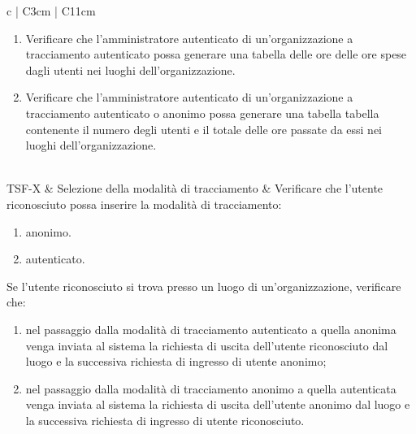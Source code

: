 {\begin{longtable}{ c | C{3cm} | C{11cm} }
\begin{enumerate}
\item Verificare che l'amministratore autenticato di un'organizzazione a tracciamento autenticato possa generare una tabella delle ore delle ore spese dagli utenti nei luoghi dell'organizzazione.
\item Verificare che l'amministratore autenticato di un'organizzazione a tracciamento autenticato o anonimo possa generare una tabella tabella contenente il numero degli utenti e il totale delle ore passate da essi nei luoghi dell’organizzazione. 
\end{enumerate} \\


TSF-X & Selezione della modalità di tracciamento & 
Verificare che l'utente riconosciuto possa inserire la modalità di tracciamento:
\begin{enumerate}
    \item anonimo.
    \item autenticato.
\end{enumerate}
Se l'utente riconosciuto si trova presso un luogo di un'organizzazione, verificare che:
\begin{enumerate}
    \item nel passaggio dalla modalità di tracciamento autenticato a quella anonima venga inviata al sistema la richiesta di uscita dell'utente riconosciuto dal luogo e la successiva richiesta di ingresso di utente anonimo;
    \item nel passaggio dalla modalità di tracciamento anonimo a quella autenticata venga inviata al sistema la richiesta di uscita dell'utente anonimo dal luogo e la successiva richiesta di ingresso di utente riconosciuto.
\end{enumerate} \\


\end{longtable}}
